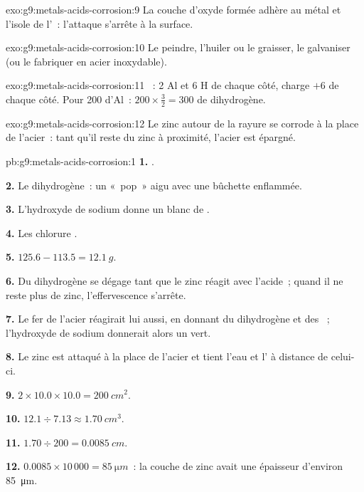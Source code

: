 \begin{solution}{exo:g9:metals-acids-corrosion:9}
La couche d'oxyde formée adhère au métal et l'isole de l'~: l'attaque
s'arrête à la surface.
\end{solution}

\begin{solution}{exo:g9:metals-acids-corrosion:10}
Le peindre, l'huiler ou le graisser, le galvaniser (ou le fabriquer en
acier inoxydable).
\end{solution}

\begin{solution}{exo:g9:metals-acids-corrosion:11}
~: 2 Al et 6 H de chaque
côté, charge $+6$ de chaque côté. Pour 200  d'Al~: $200 \times \frac{3}{2} = 300$
 de dihydrogène.
\end{solution}

\begin{solution}{exo:g9:metals-acids-corrosion:12}
Le zinc autour de la rayure se corrode à la place de l'acier~: tant
qu'il reste du zinc à proximité, l'acier est épargné.
\end{solution}

\begin{solution}{pb:g9:metals-acids-corrosion:1}
\textbf{1.} .

\textbf{2.} Le dihydrogène~: un «~pop~» aigu avec une bûchette
enflammée.

\textbf{3.} L'hydroxyde de sodium donne un  blanc de
.

\textbf{4.} Les  chlorure .

\textbf{5.} $125.6 - 113.5 = \qty{12.1}{g}$.

\textbf{6.} Du dihydrogène se dégage tant que le zinc réagit avec
l'acide~; quand il ne reste plus de zinc, l'effervescence s'arrête.

\textbf{7.} Le fer de l'acier réagirait lui aussi, en donnant du
dihydrogène et des  ~; l'hydroxyde de sodium donnerait
alors un  vert.

\textbf{8.} Le zinc est attaqué à la place de l'acier et tient l'eau et
l' à distance de celui-ci.

\textbf{9.} $2 \times 10.0 \times 10.0 = \qty{200}{cm^2}$.

\textbf{10.} $12.1 \div 7.13 \approx \qty{1.70}{cm^3}$.

\textbf{11.} $1.70 \div 200 = \qty{0.0085}{cm}$.

\textbf{12.} $0.0085 \times 10\,000 = \qty{85}{\micro m}$~: la couche de
zinc avait une épaisseur d'environ \qty{85}{\micro m}.
\end{solution}
